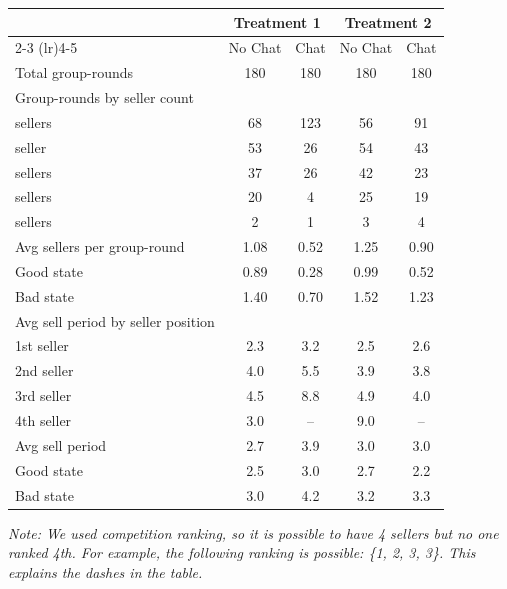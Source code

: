 \begingroup
\centering
\scriptsize
\begin{tabular}{lcccc}
\toprule
 & \multicolumn{2}{c}{Treatment 1} & \multicolumn{2}{c}{Treatment 2} \\
\cmidrule(lr){2-3} \cmidrule(lr){4-5}
 & No Chat & Chat & No Chat & Chat \\
\midrule
  Total group-rounds & 180 & 180 & 180 & 180 \\
\midrule
  Group-rounds by seller count & & & & \\
  \quad 0 sellers & 68 & 123 & 56 & 91 \\
  \quad 1 seller & 53 & 26 & 54 & 43 \\
  \quad 2 sellers & 37 & 26 & 42 & 23 \\
  \quad 3 sellers & 20 & 4 & 25 & 19 \\
  \quad 4 sellers & 2 & 1 & 3 & 4 \\
\midrule
  Avg sellers per group-round & 1.08 & 0.52 & 1.25 & 0.90 \\
  \quad Good state & 0.89 & 0.28 & 0.99 & 0.52 \\
  \quad Bad state & 1.40 & 0.70 & 1.52 & 1.23 \\
\midrule
  Avg sell period by seller position & & & & \\
  \quad 1st seller & 2.3 & 3.2 & 2.5 & 2.6 \\
  \quad 2nd seller & 4.0 & 5.5 & 3.9 & 3.8 \\
  \quad 3rd seller & 4.5 & 8.8 & 4.9 & 4.0 \\
  \quad 4th seller & 3.0 & -- & 9.0 & -- \\
\midrule
  Avg sell period & 2.7 & 3.9 & 3.0 & 3.0 \\
  \quad Good state & 2.5 & 3.0 & 2.7 & 2.2 \\
  \quad Bad state & 3.0 & 4.2 & 3.2 & 3.3 \\
\bottomrule
\end{tabular}
\par
\vspace{2pt}
\parbox{\linewidth}{\footnotesize \textit{Note: We used competition ranking, so it is possible to have 4 sellers but no one ranked 4th. For example, the following ranking is possible: \{1, 2, 3, 3\}. This explains the dashes in the table.}}
\endgroup
